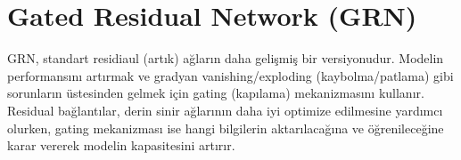 \section{Gated Residual Network (GRN)}

GRN, standart residiaul (artık) ağların daha gelişmiş bir versiyonudur. Modelin performansını artırmak ve gradyan vanishing/exploding (kaybolma/patlama) gibi sorunların üstesinden gelmek için gating (kapılama) mekanizmasını kullanır. Residual bağlantılar, derin sinir ağlarının daha iyi optimize edilmesine yardımcı olurken, gating mekanizması ise hangi bilgilerin aktarılacağına ve öğrenileceğine karar vererek modelin kapasitesini artırır.

\newpage